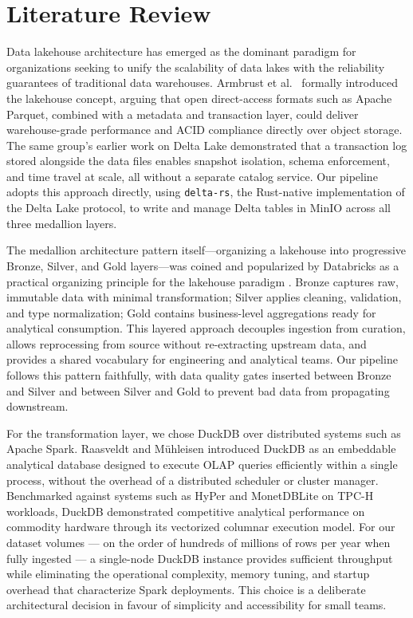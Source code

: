 \documentclass[conference]{IEEEtran}
\begin{document}
\section{Literature Review}
\label{sec:lit}

Data lakehouse architecture has emerged as the dominant paradigm for 
organizations seeking to unify the scalability of data lakes with the 
reliability guarantees of traditional data warehouses. Armbrust et al.\ 
\cite{armbrust2021lakehouse} formally introduced the lakehouse concept, 
arguing that open direct-access formats such as Apache Parquet, combined 
with a metadata and transaction layer, could deliver warehouse-grade 
performance and ACID compliance directly over object storage. The same 
group's earlier work on Delta Lake \cite{armbrust2020deltalake} 
demonstrated that a transaction log stored alongside the data files 
enables snapshot isolation, schema enforcement, and time travel at scale, 
all without a separate catalog service. Our pipeline adopts this approach 
directly, using \texttt{delta-rs}, the Rust-native implementation of the 
Delta Lake protocol, to write and manage Delta tables in MinIO across all 
three medallion layers.

The medallion architecture pattern itself---organizing a lakehouse into 
progressive Bronze, Silver, and Gold layers---was coined and popularized 
by Databricks as a practical organizing principle for the lakehouse 
paradigm \cite{databricks_medallion}. Bronze captures raw, immutable 
data with minimal transformation; Silver applies cleaning, validation, 
and type normalization; Gold contains business-level aggregations ready 
for analytical consumption. This layered approach decouples ingestion 
from curation, allows reprocessing from source without re-extracting 
upstream data, and provides a shared vocabulary for engineering and 
analytical teams. Our pipeline follows this pattern faithfully, with 
data quality gates inserted between Bronze and Silver and between Silver 
and Gold to prevent bad data from propagating downstream.

For the transformation layer, we chose DuckDB \cite{raasveldt2019duckdb} 
over distributed systems such as Apache Spark. Raasveldt and Mühleisen 
introduced DuckDB as an embeddable analytical database designed to 
execute OLAP queries efficiently within a single process, without the 
overhead of a distributed scheduler or cluster manager. Benchmarked 
against systems such as HyPer and MonetDBLite on TPC-H workloads, DuckDB 
demonstrated competitive analytical performance on commodity hardware 
through its vectorized columnar execution model. For our dataset volumes 
--- on the order of hundreds of millions of rows per year when fully 
ingested --- a single-node DuckDB instance provides sufficient throughput 
while eliminating the operational complexity, memory tuning, and startup 
overhead that characterize Spark deployments. This choice is a deliberate 
architectural decision in favour of simplicity and accessibility for 
small teams.
\end{document}
